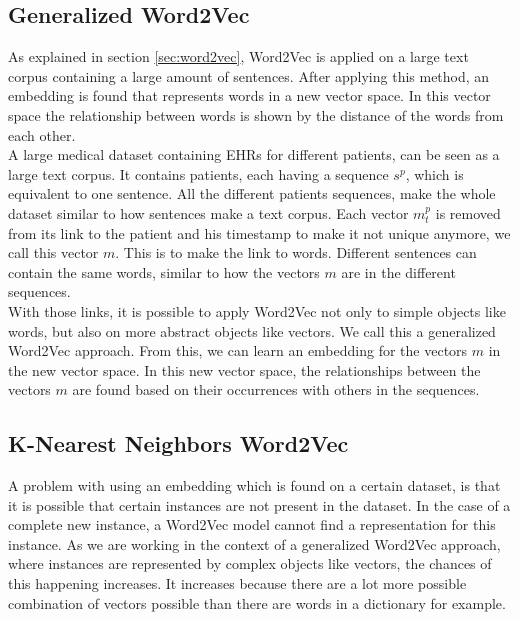 \subsection{Generalized Word2Vec}

As explained in section \ref{sec:word2vec}, Word2Vec is applied on a large text corpus containing a large amount of sentences. After applying this method, an embedding is found that represents words in a new vector space. In this vector space the relationship between words is shown by the distance of the words from each other. \\

A large medical dataset containing EHRs for different patients, can be seen as a large text corpus. It contains patients, each having a sequence $s^p$, which is equivalent to one sentence. All the different patients sequences, make the whole dataset similar to how sentences make a text corpus. Each vector $m^p_t$ is removed from its link to the patient and his timestamp to make it not unique anymore, we call this vector $m$. This is to make the link to words. Different sentences can contain the same words, similar to how the vectors $m$ are in the different sequences. \\

With those links, it is possible to apply Word2Vec not only to simple objects like words, but also on more abstract objects like vectors. We call this a generalized Word2Vec approach. From this, we can learn an embedding for the vectors $m$ in the new vector space. In this new vector space, the relationships between the vectors $m$ are found based on their occurrences with others in the sequences.


\subsection{K-Nearest Neighbors Word2Vec}

A problem with using an embedding which is found on a certain dataset, is that it is possible that certain instances are not present in the dataset. In the case of a complete new instance, a Word2Vec model cannot find a representation for this instance. As we are working in the context of a generalized Word2Vec approach, where instances are represented by complex objects like vectors, the chances of this happening increases. It increases because there are a lot more possible combination of vectors possible than there are words in a dictionary for example. \\

